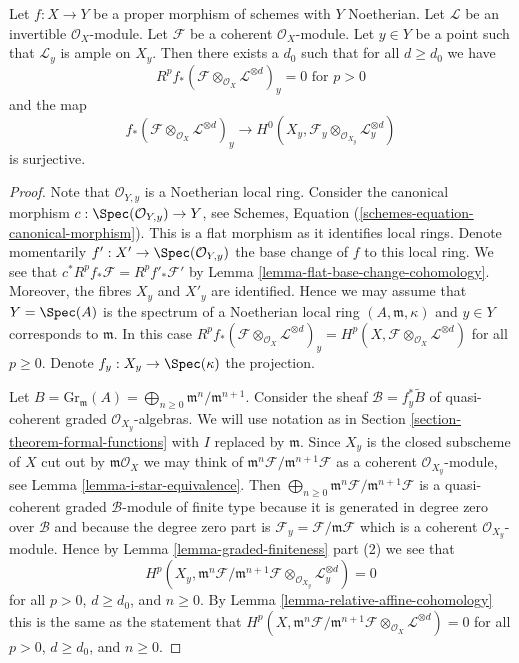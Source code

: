 \begin{lemma}
\label{lemma-ample-on-fibre}
Let $f : X \to Y$ be a proper morphism of schemes with $Y$ Noetherian.
Let $\mathcal{L}$ be an invertible $\mathcal{O}_X$-module.
Let $\mathcal{F}$ be a coherent $\mathcal{O}_X$-module.
Let $y \in Y$ be a point such that $\mathcal{L}_y$ is ample on $X_y$.
Then there exists a $d_0$ such that for all $d \geq d_0$ we have
$$
R^pf_*(\mathcal{F} \otimes_{\mathcal{O}_X} \mathcal{L}^{\otimes d})_y = 0
\text{ for }p > 0
$$
and the map
$$
f_*(\mathcal{F} \otimes_{\mathcal{O}_X} \mathcal{L}^{\otimes d})_y
\longrightarrow
H^0(X_y, \mathcal{F}_y \otimes_{\mathcal{O}_{X_y}} \mathcal{L}_y^{\otimes d})
$$
is surjective.
\end{lemma}

\begin{proof}
Note that $\mathcal{O}_{Y, y}$ is a Noetherian local ring.
Consider the canonical morphism
$c : \Spec(\mathcal{O}_{Y, y}) \to Y$, see
Schemes, Equation (\ref{schemes-equation-canonical-morphism}).
This is a flat morphism as it identifies local rings.
Denote momentarily $f' : X' \to \Spec(\mathcal{O}_{Y, y})$
the base change of $f$ to this local ring. We see that
$c^*R^pf_*\mathcal{F} = R^pf'_*\mathcal{F}'$ by
Lemma \ref{lemma-flat-base-change-cohomology}.
Moreover, the fibres $X_y$ and $X'_y$ are identified.
Hence we may assume that $Y = \Spec(A)$ is the spectrum of
a Noetherian local ring $(A, \mathfrak m, \kappa)$ and $y \in Y$
corresponds to $\mathfrak m$. In this case
$R^pf_*(\mathcal{F} \otimes_{\mathcal{O}_X} \mathcal{L}^{\otimes d})_y =
H^p(X, \mathcal{F} \otimes_{\mathcal{O}_X} \mathcal{L}^{\otimes d})$
for all $p \geq 0$. Denote $f_y : X_y \to \Spec(\kappa)$ the projection.

\medskip\noindent
Let $B = \text{Gr}_\mathfrak m(A) =
\bigoplus_{n \geq 0} \mathfrak m^n/\mathfrak m^{n + 1}$.
Consider the sheaf $\mathcal{B} = f_y^*\widetilde{B}$
of quasi-coherent graded $\mathcal{O}_{X_y}$-algebras.
We will use notation as in Section \ref{section-theorem-formal-functions}
with $I$ replaced by $\mathfrak m$.
Since $X_y$ is the closed subscheme of $X$ cut out by
$\mathfrak m\mathcal{O}_X$ we may think of
$\mathfrak m^n\mathcal{F}/\mathfrak m^{n + 1}\mathcal{F}$
as a coherent $\mathcal{O}_{X_y}$-module, see
Lemma \ref{lemma-i-star-equivalence}. Then
$\bigoplus_{n \geq 0} \mathfrak m^n\mathcal{F}/\mathfrak m^{n + 1}\mathcal{F}$
is a quasi-coherent graded $\mathcal{B}$-module of finite type
because it is generated in degree zero over $\mathcal{B}$
and because the degree zero part is
$\mathcal{F}_y = \mathcal{F}/\mathfrak m \mathcal{F}$
which is a coherent $\mathcal{O}_{X_y}$-module.
Hence by Lemma \ref{lemma-graded-finiteness} part (2)
we see that
$$
H^p(X_y, \mathfrak m^n \mathcal{F}/ \mathfrak m^{n + 1}\mathcal{F}
\otimes_{\mathcal{O}_{X_y}} \mathcal{L}_y^{\otimes d}) = 0
$$
for all $p > 0$, $d \geq d_0$, and $n \geq 0$. By
Lemma \ref{lemma-relative-affine-cohomology}
this is the same as the statement that
$
H^p(X, \mathfrak m^n \mathcal{F}/ \mathfrak m^{n + 1}\mathcal{F}
\otimes_{\mathcal{O}_X} \mathcal{L}^{\otimes d}) = 0
$
for all $p > 0$, $d \geq d_0$, and $n \geq 0$.


\end{proof}
